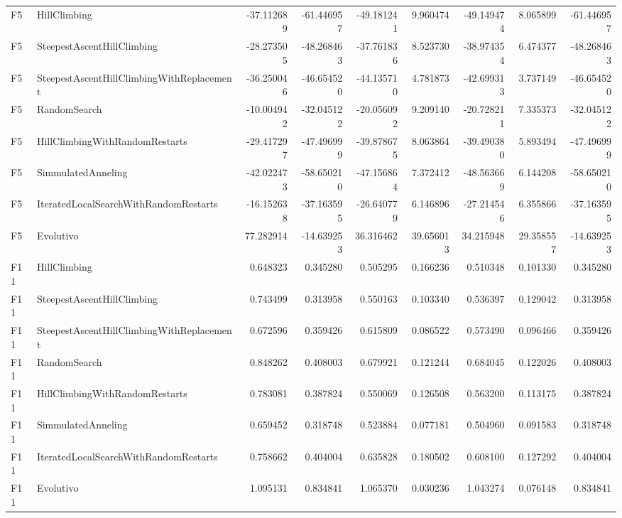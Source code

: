 \begin{tabular}{llrrrrrrr}
F5 & HillClimbing & -37.112689 & -61.446957 & -49.181241 & 9.960474 & -49.149474 & 8.065899 & -61.446957 \\
F5 & SteepestAscentHillClimbing & -28.273505 & -48.268463 & -37.761836 & 8.523730 & -38.974354 & 6.474377 & -48.268463 \\
F5 & SteepestAscentHillClimbingWithReplacement & -36.250046 & -46.654520 & -44.135710 & 4.781873 & -42.699313 & 3.737149 & -46.654520 \\
F5 & RandomSearch & -10.004942 & -32.045122 & -20.056092 & 9.209140 & -20.728211 & 7.335373 & -32.045122 \\
F5 & HillClimbingWithRandomRestarts & -29.417297 & -47.496999 & -39.878675 & 8.063864 & -39.490380 & 5.893494 & -47.496999 \\
F5 & SimmulatedAnneling & -42.022473 & -58.650210 & -47.156864 & 7.372412 & -48.563669 & 6.144208 & -58.650210 \\
F5 & IteratedLocalSearchWithRandomRestarts & -16.152638 & -37.163595 & -26.640779 & 6.146896 & -27.214546 & 6.355866 & -37.163595 \\
F5 & Evolutivo & 77.282914 & -14.639253 & 36.316462 & 39.656013 & 34.215948 & 29.358557 & -14.639253 \\
F11 & HillClimbing & 0.648323 & 0.345280 & 0.505295 & 0.166236 & 0.510348 & 0.101330 & 0.345280 \\
F11 & SteepestAscentHillClimbing & 0.743499 & 0.313958 & 0.550163 & 0.103340 & 0.536397 & 0.129042 & 0.313958 \\
F11 & SteepestAscentHillClimbingWithReplacement & 0.672596 & 0.359426 & 0.615809 & 0.086522 & 0.573490 & 0.096466 & 0.359426 \\
F11 & RandomSearch & 0.848262 & 0.408003 & 0.679921 & 0.121244 & 0.684045 & 0.122026 & 0.408003 \\
F11 & HillClimbingWithRandomRestarts & 0.783081 & 0.387824 & 0.550069 & 0.126508 & 0.563200 & 0.113175 & 0.387824 \\
F11 & SimmulatedAnneling & 0.659452 & 0.318748 & 0.523884 & 0.077181 & 0.504960 & 0.091583 & 0.318748 \\
F11 & IteratedLocalSearchWithRandomRestarts & 0.758662 & 0.404004 & 0.635828 & 0.180502 & 0.608100 & 0.127292 & 0.404004 \\
F11 & Evolutivo & 1.095131 & 0.834841 & 1.065370 & 0.030236 & 1.043274 & 0.076148 & 0.834841 \\
\bottomrule
\end{tabular}
